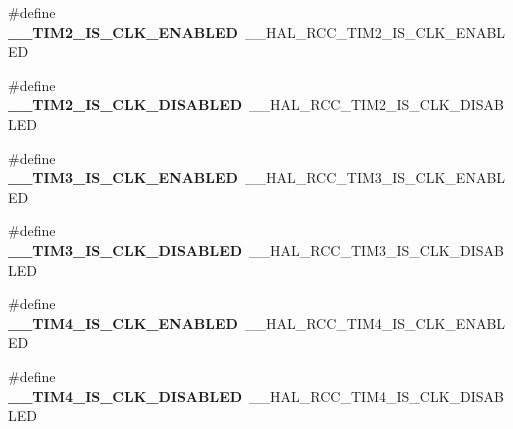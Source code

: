 \begin{DoxyCompactItemize}
\item 
\#define {\bfseries \+\_\+\+\_\+\+T\+I\+M2\+\_\+\+I\+S\+\_\+\+C\+L\+K\+\_\+\+E\+N\+A\+B\+L\+ED}~\+\_\+\+\_\+\+H\+A\+L\+\_\+\+R\+C\+C\+\_\+\+T\+I\+M2\+\_\+\+I\+S\+\_\+\+C\+L\+K\+\_\+\+E\+N\+A\+B\+L\+ED\hypertarget{group___h_a_l___r_c_c___aliased_gab47df1a0dae3104f5ead354b24c37a1e}{}\label{group___h_a_l___r_c_c___aliased_gab47df1a0dae3104f5ead354b24c37a1e}

\item 
\#define {\bfseries \+\_\+\+\_\+\+T\+I\+M2\+\_\+\+I\+S\+\_\+\+C\+L\+K\+\_\+\+D\+I\+S\+A\+B\+L\+ED}~\+\_\+\+\_\+\+H\+A\+L\+\_\+\+R\+C\+C\+\_\+\+T\+I\+M2\+\_\+\+I\+S\+\_\+\+C\+L\+K\+\_\+\+D\+I\+S\+A\+B\+L\+ED\hypertarget{group___h_a_l___r_c_c___aliased_gae39de686b2eac091789e171236cb2456}{}\label{group___h_a_l___r_c_c___aliased_gae39de686b2eac091789e171236cb2456}

\item 
\#define {\bfseries \+\_\+\+\_\+\+T\+I\+M3\+\_\+\+I\+S\+\_\+\+C\+L\+K\+\_\+\+E\+N\+A\+B\+L\+ED}~\+\_\+\+\_\+\+H\+A\+L\+\_\+\+R\+C\+C\+\_\+\+T\+I\+M3\+\_\+\+I\+S\+\_\+\+C\+L\+K\+\_\+\+E\+N\+A\+B\+L\+ED\hypertarget{group___h_a_l___r_c_c___aliased_ga7a81a91683178ecfc7ec096653e9afc8}{}\label{group___h_a_l___r_c_c___aliased_ga7a81a91683178ecfc7ec096653e9afc8}

\item 
\#define {\bfseries \+\_\+\+\_\+\+T\+I\+M3\+\_\+\+I\+S\+\_\+\+C\+L\+K\+\_\+\+D\+I\+S\+A\+B\+L\+ED}~\+\_\+\+\_\+\+H\+A\+L\+\_\+\+R\+C\+C\+\_\+\+T\+I\+M3\+\_\+\+I\+S\+\_\+\+C\+L\+K\+\_\+\+D\+I\+S\+A\+B\+L\+ED\hypertarget{group___h_a_l___r_c_c___aliased_ga282a0aadb354b24a4ec554b29a4916f8}{}\label{group___h_a_l___r_c_c___aliased_ga282a0aadb354b24a4ec554b29a4916f8}

\item 
\#define {\bfseries \+\_\+\+\_\+\+T\+I\+M4\+\_\+\+I\+S\+\_\+\+C\+L\+K\+\_\+\+E\+N\+A\+B\+L\+ED}~\+\_\+\+\_\+\+H\+A\+L\+\_\+\+R\+C\+C\+\_\+\+T\+I\+M4\+\_\+\+I\+S\+\_\+\+C\+L\+K\+\_\+\+E\+N\+A\+B\+L\+ED\hypertarget{group___h_a_l___r_c_c___aliased_ga88c7174931d62e7126a2d5f966377894}{}\label{group___h_a_l___r_c_c___aliased_ga88c7174931d62e7126a2d5f966377894}

\item 
\#define {\bfseries \+\_\+\+\_\+\+T\+I\+M4\+\_\+\+I\+S\+\_\+\+C\+L\+K\+\_\+\+D\+I\+S\+A\+B\+L\+ED}~\+\_\+\+\_\+\+H\+A\+L\+\_\+\+R\+C\+C\+\_\+\+T\+I\+M4\+\_\+\+I\+S\+\_\+\+C\+L\+K\+\_\+\+D\+I\+S\+A\+B\+L\+ED\hypertarget{group___h_a_l___r_c_c___aliased_ga18e5f75acae53aeff4a5ca7108096acb}{}\label{group___h_a_l___r_c_c___aliased_ga18e5f75acae53aeff4a5ca7108096acb}


\end{DoxyCompactItemize}
